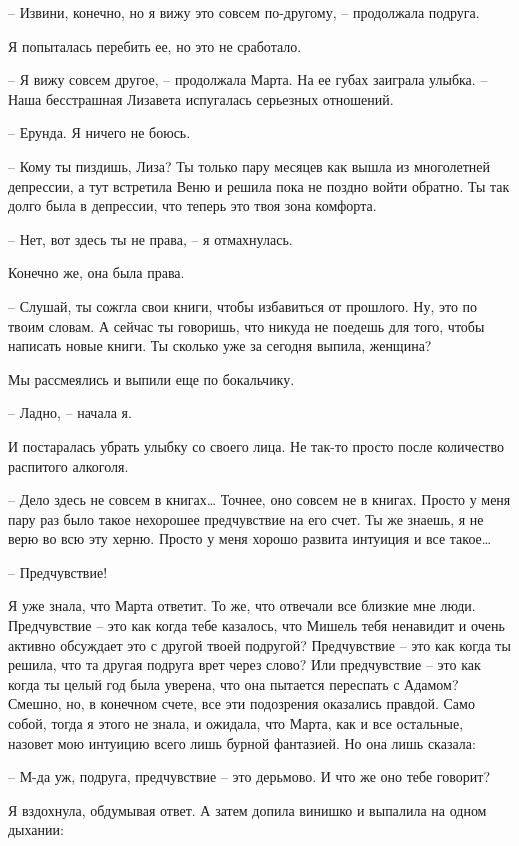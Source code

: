\documentclass[
]{book}
\begin{document}
-- Извини, конечно, но я вижу это совсем по-другому, -- продолжала подруга.

Я попыталась перебить ее, но это не сработало.

-- Я вижу совсем другое, -- продолжала Марта. На ее губах заиграла улыбка. -- Наша бесстрашная Лизавета испугалась серьезных отношений.

-- Ерунда. Я ничего не боюсь.

-- Кому ты пиздишь, Лиза? Ты только пару месяцев как вышла из многолетней депрессии, а тут встретила Веню и решила пока не поздно войти обратно. Ты так долго была в депрессии, что теперь это твоя зона комфорта.

-- Нет, вот здесь ты не права, -- я отмахнулась.

Конечно же, она была права.

-- Слушай, ты сожгла свои книги, чтобы избавиться от прошлого. Ну, это по твоим словам. А сейчас ты говоришь, что никуда не поедешь для того, чтобы написать новые книги. Ты сколько уже за сегодня выпила, женщина?

Мы рассмеялись и выпили еще по бокальчику.

-- Ладно, -- начала я.

И постаралась убрать улыбку со своего лица. Не так-то просто после количество распитого алкоголя.

-- Дело здесь не совсем в книгах\ldots{} Точнее, оно совсем не в книгах. Просто у меня пару раз было такое нехорошее предчувствие на его счет. Ты же знаешь, я не верю во всю эту херню. Просто у меня хорошо развита интуиция и все такое\ldots{}

-- Предчувствие!

Я уже знала, что Марта ответит. То же, что отвечали все близкие мне люди. Предчувствие -- это как когда тебе казалось, что Мишель тебя ненавидит и очень активно обсуждает это с другой твоей подругой? Предчувствие -- это как когда ты решила, что та другая подруга врет через слово? Или предчувствие -- это как когда ты целый год была уверена, что она пытается переспать с Адамом? Смешно, но, в конечном счете, все эти подозрения оказались правдой. Само собой, тогда я этого не знала, и ожидала, что Марта, как и все остальные, назовет мою интуицию всего лишь бурной фантазией. Но она лишь сказала:

-- М-да уж, подруга, предчувствие -- это дерьмово. И что же оно тебе говорит?

Я вздохнула, обдумывая ответ. А затем допила винишко и выпалила на одном дыхании:
\end{document}
